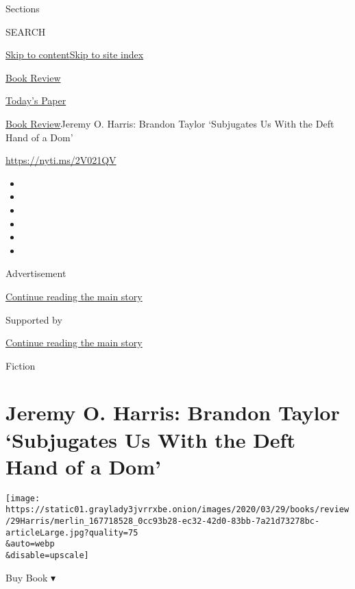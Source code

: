 Sections

SEARCH

\protect\hyperlink{site-content}{Skip to
content}\protect\hyperlink{site-index}{Skip to site index}

\href{https://www.nytimes3xbfgragh.onion/section/books/review}{Book
Review}

\href{https://myaccount.nytimes3xbfgragh.onion/auth/login?response_type=cookie\&client_id=vi}{}

\href{https://www.nytimes3xbfgragh.onion/section/todayspaper}{Today's
Paper}

\href{/section/books/review}{Book Review}\textbar{}Jeremy O. Harris:
Brandon Taylor `Subjugates Us With the Deft Hand of a Dom'

\url{https://nyti.ms/2V021QV}

\begin{itemize}
\item
\item
\item
\item
\item
\item
\end{itemize}

Advertisement

\protect\hyperlink{after-top}{Continue reading the main story}

Supported by

\protect\hyperlink{after-sponsor}{Continue reading the main story}

Fiction

\hypertarget{jeremy-o-harris-brandon-taylor-subjugates-us-with-the-deft-hand-of-a-dom}{%
\section{Jeremy O. Harris: Brandon Taylor `Subjugates Us With the Deft
Hand of a
Dom'}\label{jeremy-o-harris-brandon-taylor-subjugates-us-with-the-deft-hand-of-a-dom}}

\texttt{[image: https://static01.graylady3jvrrxbe.onion/images/2020/03/29/books/review/29Harris/merlin\_167718528\_0cc93b28-ec32-42d0-83bb-7a21d73278bc-articleLarge.jpg?quality=75\\\&auto=webp\\\&disable=upscale]}

Buy Book ▾

